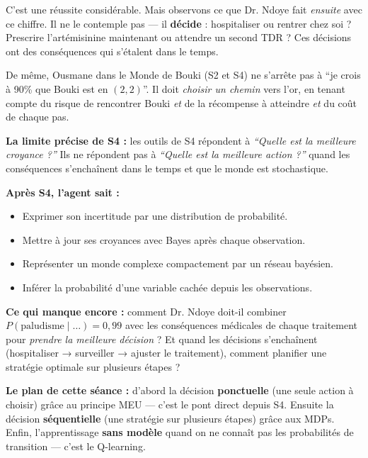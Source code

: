 \documentclass[11pt,a4paper]{article}
\begin{document}
C'est une réussite considérable. Mais observons ce que Dr. Ndoye fait \textit{ensuite} avec ce chiffre. Il ne le contemple pas --- il \textbf{décide} : hospitaliser ou rentrer chez soi ? Prescrire l'artémisinine maintenant ou attendre un second TDR ? Ces décisions ont des conséquences qui s'étalent dans le temps.

De même, Ousmane dans le Monde de Bouki (S2 et S4) ne s'arrête pas à ``je crois à 90\% que Bouki est en $(2,2)$''. Il doit \textit{choisir un chemin} vers l'or, en tenant compte du risque de rencontrer Bouki \textit{et} de la récompense à atteindre \textit{et} du coût de chaque pas.

\textbf{La limite précise de S4 :} les outils de S4 répondent à \textit{``Quelle est la meilleure croyance ?''} Ils ne répondent pas à \textit{``Quelle est la meilleure action ?''} quand les conséquences s'enchaînent dans le temps et que le monde est stochastique.

\begin{prereqbox}
\textbf{Après S4, l'agent sait :}
\begin{itemize}[nosep]
    \item Exprimer son incertitude par une distribution de probabilité.
    \item Mettre à jour ses croyances avec Bayes après chaque observation.
    \item Représenter un monde complexe compactement par un réseau bayésien.
    \item Inférer la probabilité d'une variable cachée depuis les observations.
\end{itemize}

\textbf{Ce qui manque encore :} comment Dr. Ndoye doit-il combiner $P(\text{paludisme} \mid \ldots)= 0{,}99$ avec les conséquences médicales de chaque traitement pour \textit{prendre la meilleure décision} ? Et quand les décisions s'enchaînent (hospitaliser → surveiller → ajuster le traitement), comment planifier une stratégie optimale sur plusieurs étapes ?

\medskip
\textbf{Le plan de cette séance :} d'abord la décision \textbf{ponctuelle} (une seule action à choisir) grâce au principe MEU --- c'est le pont direct depuis S4. Ensuite la décision \textbf{séquentielle} (une stratégie sur plusieurs étapes) grâce aux MDPs. Enfin, l'apprentissage \textbf{sans modèle} quand on ne connaît pas les probabilités de transition --- c'est le Q-learning.
\end{prereqbox}
\end{document}
